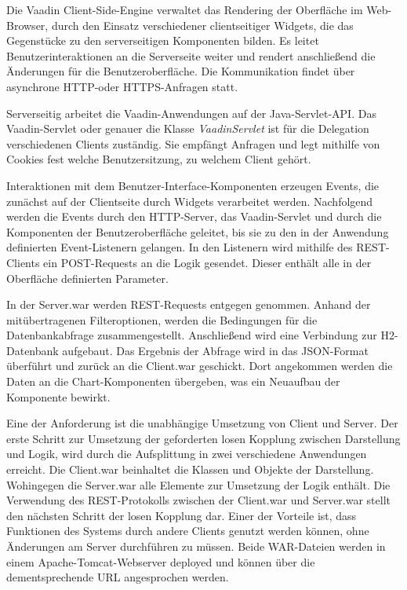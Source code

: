 Die Vaadin Client-Side-Engine verwaltet das Rendering der Oberfläche im Web-Browser, durch den Einsatz verschiedener clientseitiger Widgets, die das Gegenstücke zu den serverseitigen Komponenten bilden. Es leitet Benutzerinteraktionen an die Serverseite weiter und rendert anschließend die Änderungen für die Benutzeroberfläche. Die Kommunikation findet über asynchrone HTTP-oder HTTPS-Anfragen statt.

Serverseitig arbeitet die Vaadin-Anwendungen auf der Java-Servlet-API. Das Vaadin-Servlet oder genauer die Klasse \textit{VaadinServlet} ist für die Delegation verschiedenen Clients zuständig. Sie empfängt Anfragen und legt mithilfe von Cookies fest welche Benutzersitzung, zu welchem Client gehört.

Interaktionen mit dem Benutzer-Interface-Komponenten erzeugen Events, die zunächst auf der Clientseite durch Widgets verarbeitet werden. Nachfolgend werden die Events durch den HTTP-Server, das Vaadin-Servlet und durch die Komponenten der Benutzeroberfläche geleitet, bis sie zu den in der Anwendung definierten Event-Listenern gelangen. In den Listenern wird mithilfe des REST-Clients ein POST-Requests an die Logik gesendet. Dieser enthält alle in der Oberfläche definierten Parameter. 

In der Server.war werden REST-Requests entgegen genommen. Anhand der mitübertragenen Filteroptionen, werden die Bedingungen für die Datenbankabfrage zusammengestellt. Anschließend wird eine Verbindung zur H2-Datenbank aufgebaut. Das Ergebnis der Abfrage wird in das JSON-Format überführt und zurück an die Client.war geschickt. Dort angekommen werden die Daten an die Chart-Komponenten übergeben, was ein Neuaufbau der Komponente bewirkt.      

Eine der Anforderung ist die unabhängige Umsetzung von Client und Server. Der erste Schritt zur Umsetzung der geforderten losen Kopplung zwischen Darstellung und Logik, wird durch die Aufsplittung in zwei verschiedene Anwendungen erreicht. Die Client.war beinhaltet die Klassen und Objekte der Darstellung. Wohingegen die Server.war alle Elemente zur Umsetzung der Logik enthält. Die Verwendung des REST-Protokolls zwischen der Client.war und Server.war stellt den nächsten Schritt der losen Kopplung dar. Einer der Vorteile ist, dass Funktionen des Systems durch andere Clients genutzt werden können, ohne Änderungen am Server durchführen zu müssen. Beide WAR-Dateien werden in einem Apache-Tomcat-Webserver deployed und können über die dementsprechende URL angesprochen werden.

